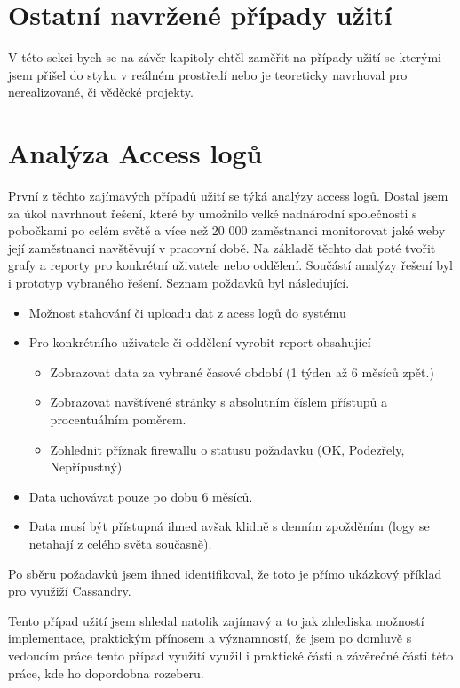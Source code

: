 \section{Ostatní navržené případy užití}

V této sekci bych se na závěr kapitoly chtěl zaměřit na případy užití se kterými jsem přišel do styku v reálném prostředí nebo je teoreticky navrhoval pro nerealizované, či věděcké projekty. 

\section{Analýza Access logů}
První z těchto zajímavých případů užití se týká analýzy access logů. Dostal jsem za úkol navrhnout řešení, které by umožnilo velké nadnárodní společnosti s pobočkami po celém světě a více než 20 000 zaměstnanci monitorovat jaké weby její zaměstnanci navštěvují v pracovní době. Na základě těchto dat poté tvořit grafy a reporty pro konkrétní uživatele nebo oddělení. Součástí analýzy řešení byl i prototyp vybraného řešení. Seznam poždavků byl následující. 

\begin{itemize}
\item Možnost stahování či uploadu dat z acess logů do systému
\item Pro konkrétního uživatele či oddělení vyrobit report obsahující
\begin{itemize}
\item Zobrazovat data za vybrané časové období (1 týden až 6 měsíců zpět.) 
\item Zobrazovat navštívené stránky s absolutním číslem přístupů a procentuálním poměrem. 
\item Zohlednit příznak firewallu o statusu požadavku (OK, Podezřely, Nepřípustný)  
\end{itemize}
\item Data uchovávat pouze po dobu 6 měsíců. 
\item Data musí být přístupná ihned avšak klidně s denním zpožděním (logy se netahají z celého světa současně). 
\end{itemize}

Po sběru požadavků jsem ihned identifikoval, že toto je přímo ukázkový příklad pro využiží Cassandry. 

Tento případ užití jsem shledal natolik zajímavý a to jak zhlediska možností implementace, praktickým přínosem a významností, že jsem po domluvě s vedoucím práce tento případ využití využil i praktické části a závěrečné části této práce, kde ho dopordobna rozeberu.

